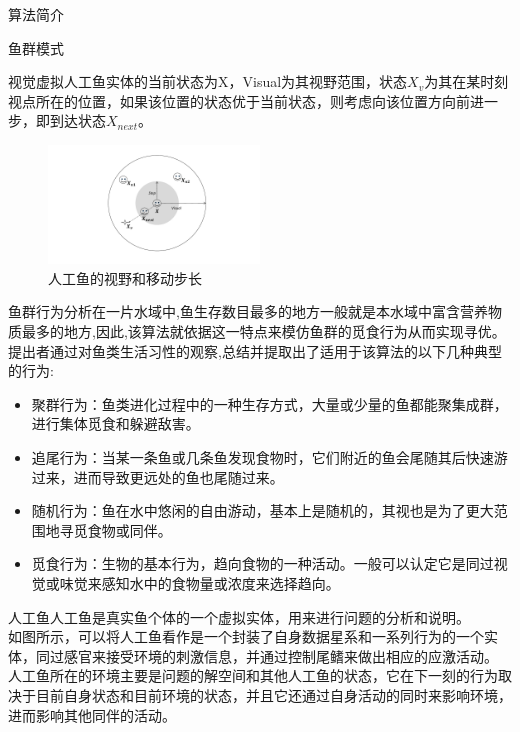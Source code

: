 \documentclass[UTF8]{ctexart}
\begin{document}
\begin{section}
{算法简介}
\begin{subsection}
{鱼群模式}
\begin{subsubsection}
{视觉}虚拟人工鱼实体的当前状态为X，Visual为其视野范围，状态$X_v$为其在某时刻视点所在的位置，如果该位置的状态优于当前状态，则考虑向该位置方向前进一步，即到达状态$X_{next}。$
\begin{figure}[htbp]
	\centering
	\includegraphics[width=0.5\textwidth]{../../pic/fish1.pdf}
	\caption{人工鱼的视野和移动步长}
\end{figure}
\end{subsubsection}
\begin{subsubsection}
{鱼群行为分析}在一片水域中,鱼生存数目最多的地方一般就是本水域中富含营养物质最多的地方,因此,该算法就依据这一特点来模仿鱼群的觅食行为从而实现寻优。提出者通过对鱼类生活习性的观察,总结并提取出了适用于该算法的以下几种典型的行为:
\begin{itemize}
	\item{聚群行为：鱼类进化过程中的一种生存方式，大量或少量的鱼都能聚集成群，进行集体觅食和躲避敌害。}
	\item{追尾行为：当某一条鱼或几条鱼发现食物时，它们附近的鱼会尾随其后快速游过来，进而导致更远处的鱼也尾随过来。}
	\item{随机行为：鱼在水中悠闲的自由游动，基本上是随机的，其视也是为了更大范围地寻觅食物或同伴。}
	\item{觅食行为：生物的基本行为，趋向食物的一种活动。一般可以认定它是同过视觉或味觉来感知水中的食物量或浓度来选择趋向。}
\end{itemize}
\end{subsubsection}
\begin{subsubsection}
{人工鱼}人工鱼是真实鱼个体的一个虚拟实体，用来进行问题的分析和说明。\\如图所示，可以将人工鱼看作是一个封装了自身数据星系和一系列行为的一个实体，同过感官来接受环境的刺激信息，并通过控制尾鳍来做出相应的应激活动。\\人工鱼所在的环境主要是问题的解空间和其他人工鱼的状态，它在下一刻的行为取决于目前自身状态和目前环境的状态，并且它还通过自身活动的同时来影响环境，进而影响其他同伴的活动。

\end{subsubsection}
\end{subsection}
\end{section}
\end{document}
